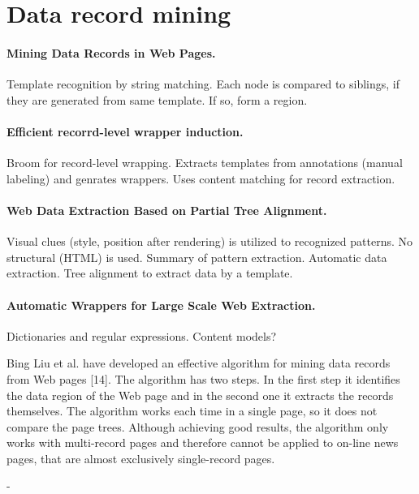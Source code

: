 \section{Data record mining}

\paragraph{Mining Data Records in Web Pages.} Template recognition by string matching. Each node is compared to siblings, if they are generated from same template. If so, form a region.

\paragraph{Efficient recorrd-level wrapper induction.} Broom for record-level wrapping. Extracts templates from annotations (manual labeling) and genrates wrappers. Uses content matching for record extraction.

\paragraph{Web Data Extraction Based on Partial Tree Alignment.} Visual clues (style, position after rendering) is utilized to recognized patterns. No structural (HTML) is used. Summary of pattern extraction. Automatic data extraction. Tree alignment to extract data by a template.

\paragraph{Automatic Wrappers for Large Scale Web Extraction.} Dictionaries and regular expressions. Content models?

Bing Liu et al. have developed an effective algorithm for mining
data records from Web pages [14]. The algorithm has two steps.
In the first step it identifies the data region of the Web page and in
the second one it extracts the records themselves. The algorithm
works each time in a single page, so it does not compare the page
trees. Although achieving good results, the algorithm only works
with multi-record pages and therefore cannot be applied to on-line
news pages, that are almost exclusively single-record pages.

- 

